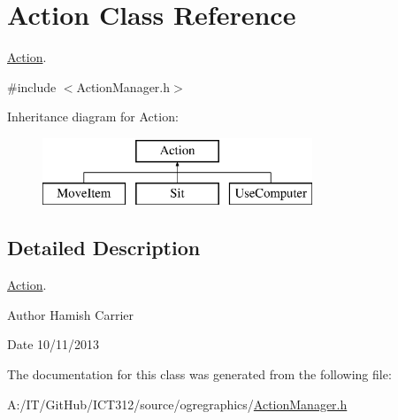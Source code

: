 \hypertarget{class_action}{\section{Action Class Reference}
\label{class_action}
}


\hyperlink{class_action}{Action}.  




{\ttfamily \#include $<$Action\-Manager.\-h$>$}

Inheritance diagram for Action\-:\begin{figure}[H]
\begin{center}
\leavevmode
\includegraphics[height=2.000000cm]{class_action}
\end{center}
\end{figure}


\subsection{Detailed Description}
\hyperlink{class_action}{Action}. 

\begin{DoxyAuthor}{Author}
Hamish Carrier 
\end{DoxyAuthor}
\begin{DoxyDate}{Date}
10/11/2013 
\end{DoxyDate}


The documentation for this class was generated from the following file\-:\begin{DoxyCompactItemize}
\item 
A\-:/\-I\-T/\-Git\-Hub/\-I\-C\-T312/source/ogregraphics/\hyperlink{_action_manager_8h}{Action\-Manager.\-h}\end{DoxyCompactItemize}

